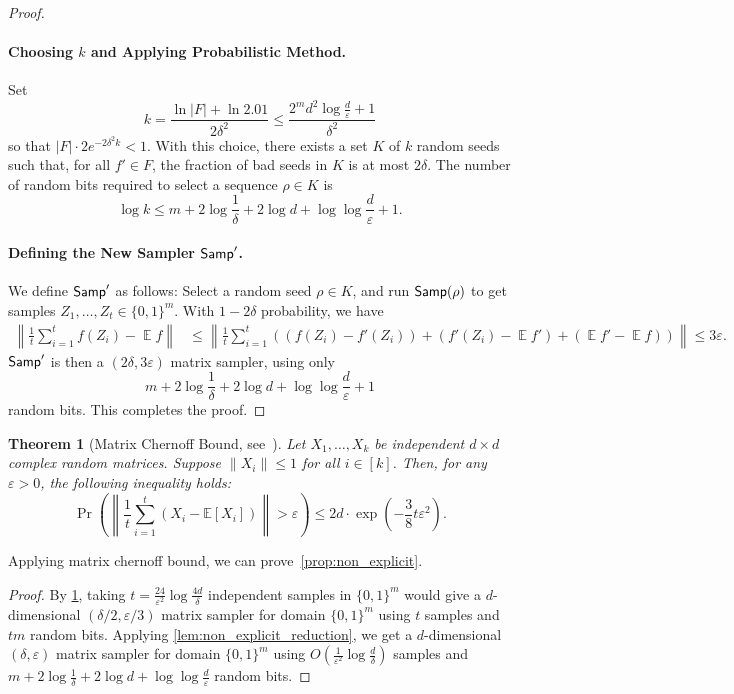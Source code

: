 \documentclass[10pt,a4paper]{article}
\newtheorem{theorem}{Theorem}
\DeclareMathOperator*{\E}{\mathbb{E}}
\newcommand{\eps}{\varepsilon}
\newcommand{\1}{\mathbbm{1}}
\newcommand{\tuple}[1]{\left(#1\right)}
\newcommand{\zo}{\{0, 1\}}
\newcommand{\Smp}{\textup{\textsf{Samp}}}
\begin{document}
\begin{proof}
\paragraph{Choosing \( k \) and Applying Probabilistic Method.}
Set 
\[
k = \frac{\ln|F| + \ln 2.01}{2\delta^2} \le \frac{2^{m}d^2\log\frac{d}{\eps} + 1}{\delta^2}
\]
so that \( |F| \cdot 2 e^{-2\delta^2 k} < 1 \). With this choice, there exists a set \( K \) of \( k \) random seeds such that, for all \( f' \in F \), the fraction of bad seeds in \( K \) is at most \( 2\delta \). The number of random bits required to select a sequence \( \rho \in K \) is 
\[
\log k \le m + 2 \log \frac{1}{\delta} + 2 \log d + \log \log \frac{d}{\eps} + 1.
\]

\paragraph{Defining the New Sampler \( \Smp' \).}
We define \( \Smp' \) as follows: Select a random seed \( \rho \in K \), and run \( \Smp(\rho) \) to get samples $Z_1, \dots, Z_t \in \zo^m$. With $1 - 2\delta$ probability, we have 
\begin{align*}
\left\| \frac{1}{t} \sum_{i=1}^t f(Z_i) - \E f \right\| &\leq \left\| \frac{1}{t} \sum_{i=1}^t \left( (f(Z_i) -  f'(Z_i)) + (f'(Z_i)  - \E f') + (\E f' - \E f) \right) \right\| \le 3\eps.
\end{align*}
\( \Smp' \) is then a \( (2\delta, 3\eps) \) matrix sampler, using only 
\[
 m + 2 \log \frac{1}{\delta} + 2 \log d + \log \log \frac{d}{\eps} + 1
\]
random bits.
This completes the proof.
\end{proof}

\begin{theorem}[Matrix Chernoff Bound, see~\cite{Tro15}]
    \label{thm:matrix_chernoff_bound}
    Let $X_1, \dots, X_k$ be independent $d \times d$ complex random matrices. Suppose  $\|X_i\| \leq 1$ for all $i \in [k]$. Then, for any $\varepsilon > 0$, the following inequality holds:
    \[
    \Pr\left( \left\| \frac{1}{t} \sum_{i=1}^t \tuple{ X_i - \mathbb{E}[X_i]} \right\| > \varepsilon \right) \leq 2d \cdot \exp\left( - \frac{3 }{8}  t\eps^2 \right).
    \]
\end{theorem}

Applying matrix chernoff bound, we can prove~\cref{prop:non_explicit}.

\nonExplicit*
\begin{proof}
    By \cref{thm:matrix_chernoff_bound}, taking $t = \frac{24}{\eps^2}\log\frac{4d}{\delta}$ independent samples in $\zo^m$ would give a $d$-dimensional $(\delta / 2, \eps / 3)$ matrix sampler for domain $\zo^m$ using $t$ samples and $tm$ random bits. Applying \cref{lem:non_explicit_reduction}, we get a $d$-dimensional $(\delta, \eps)$ matrix sampler for domain $\zo^m$ using $O(\frac{1}{\eps^2}\log\frac{d}{\delta})$ samples and $m + 2\log\frac{1}{\delta} + 2 \log d + \log \log \frac{d}{\eps}$ random bits.
\end{proof}
\end{document}
